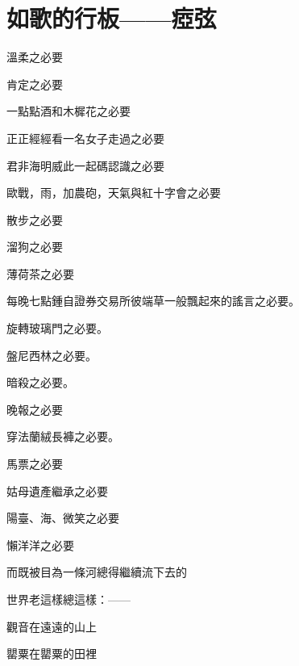 \section{如歌的行板——瘂弦}

溫柔之必要

肯定之必要

一點點酒和木樨花之必要

正正經經看一名女子走過之必要

君非海明威此一起碼認識之必要

歐戰，雨，加農砲，天氣與紅十字會之必要

散步之必要

溜狗之必要

薄荷茶之必要

每晚七點鍾自證券交易所彼端草一般飄起來的謠言之必要。

旋轉玻璃門之必要。

盤尼西林之必要。

暗殺之必要。

晚報之必要

穿法蘭絨長褲之必要。

馬票之必要

姑母遺產繼承之必要

陽臺、海、微笑之必要

懶洋洋之必要


而既被目為一條河總得繼續流下去的

世界老這樣總這樣：——

觀音在遠遠的山上

罌粟在罌粟的田裡
